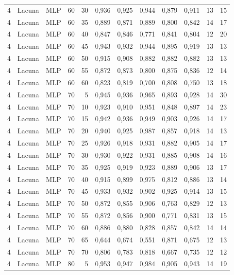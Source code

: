 \begin{longtable}{@{}rllrrrrrrrrr@{}}
4 & Lacuna & MLP & 60 & 30 & 0,936 & 0,925 & 0,944 & 0,879 & 0,911 & 13 & 15 \\
4 & Lacuna & MLP & 60 & 35 & 0,889 & 0,871 & 0,889 & 0,800 & 0,842 & 14 & 17 \\
4 & Lacuna & MLP & 60 & 40 & 0,847 & 0,846 & 0,771 & 0,841 & 0,804 & 12 & 20 \\
4 & Lacuna & MLP & 60 & 45 & 0,943 & 0,932 & 0,944 & 0,895 & 0,919 & 13 & 13 \\
4 & Lacuna & MLP & 60 & 50 & 0,915 & 0,908 & 0,882 & 0,882 & 0,882 & 13 & 13 \\
4 & Lacuna & MLP & 60 & 55 & 0,872 & 0,873 & 0,800 & 0,875 & 0,836 & 12 & 14 \\
4 & Lacuna & MLP & 60 & 60 & 0,823 & 0,819 & 0,700 & 0,808 & 0,750 & 13 & 18 \\
4 & Lacuna & MLP & 70 & 5 & 0,945 & 0,936 & 0,965 & 0,893 & 0,928 & 14 & 30 \\
4 & Lacuna & MLP & 70 & 10 & 0,923 & 0,910 & 0,951 & 0,848 & 0,897 & 14 & 23 \\
4 & Lacuna & MLP & 70 & 15 & 0,942 & 0,936 & 0,949 & 0,903 & 0,926 & 14 & 17 \\
4 & Lacuna & MLP & 70 & 20 & 0,940 & 0,925 & 0,987 & 0,857 & 0,918 & 14 & 13 \\
4 & Lacuna & MLP & 70 & 25 & 0,926 & 0,918 & 0,931 & 0,882 & 0,905 & 14 & 17 \\
4 & Lacuna & MLP & 70 & 30 & 0,930 & 0,922 & 0,931 & 0,885 & 0,908 & 14 & 16 \\
4 & Lacuna & MLP & 70 & 35 & 0,925 & 0,919 & 0,923 & 0,889 & 0,906 & 13 & 17 \\
4 & Lacuna & MLP & 70 & 40 & 0,915 & 0,899 & 0,975 & 0,812 & 0,886 & 13 & 14 \\
4 & Lacuna & MLP & 70 & 45 & 0,933 & 0,932 & 0,902 & 0,925 & 0,914 & 13 & 15 \\
4 & Lacuna & MLP & 70 & 50 & 0,872 & 0,855 & 0,906 & 0,763 & 0,829 & 12 & 13 \\
4 & Lacuna & MLP & 70 & 55 & 0,872 & 0,856 & 0,900 & 0,771 & 0,831 & 13 & 15 \\
4 & Lacuna & MLP & 70 & 60 & 0,886 & 0,880 & 0,828 & 0,857 & 0,842 & 14 & 14 \\
4 & Lacuna & MLP & 70 & 65 & 0,644 & 0,674 & 0,551 & 0,871 & 0,675 & 12 & 13 \\
4 & Lacuna & MLP & 70 & 70 & 0,806 & 0,783 & 0,818 & 0,667 & 0,735 & 12 & 12 \\
4 & Lacuna & MLP & 80 & 5 & 0,953 & 0,947 & 0,984 & 0,905 & 0,943 & 14 & 19 \\

\end{longtable}

